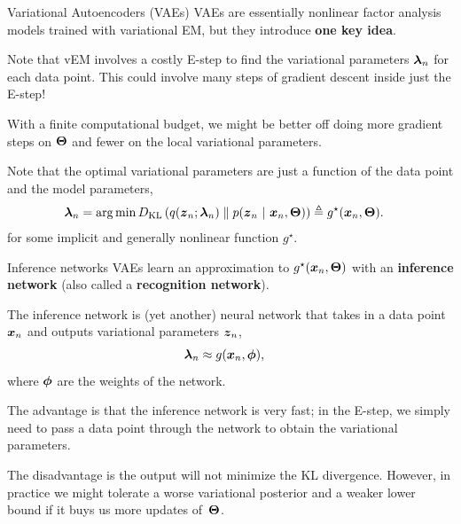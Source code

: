 \documentclass[aspectratio=169]{beamer}
\begin{document}
\begin{frame}{Variational Autoencoders (VAEs)}
VAEs are essentially nonlinear factor analysis models trained with variational EM, but they introduce \textbf{one key idea}.

Note that vEM involves a costly E-step to find the variational parameters $\boldsymbol{\lambda}_n$ for each data point. This could involve many steps of gradient descent inside just the E-step!

With a finite computational budget, we might be better off doing more gradient steps on $\boldsymbol{\Theta}$ and fewer on the local variational parameters.

Note that the optimal variational parameters are just a function of the data point and the model parameters,
\begin{align}
    \boldsymbol{\lambda}_n &= \operatorname*{arg\,min} D_{\textrm{KL}}\left(q(\boldsymbol{z}_n; \boldsymbol{\lambda}_n)\;\|\;p(\boldsymbol{z}_n ~\vert~ \boldsymbol{x}_n, \boldsymbol{\Theta})\right) 
    \triangleq g^\star(\boldsymbol{x}_n, \boldsymbol{\Theta}).
\end{align}
for some implicit and generally nonlinear function $g^\star$.
\end{frame}

\begin{frame}{Inference networks}
VAEs learn an approximation to $g^\star(\boldsymbol{x}_n, \boldsymbol{\Theta})$ with an \textbf{inference network} (also called a \textbf{recognition network}).

The inference network is (yet another) neural network that takes in a data point $\boldsymbol{x}_n$ and outputs variational parameters $\boldsymbol{z}_n$,
\begin{align}
    \boldsymbol{\lambda}_n & \approx g(\boldsymbol{x}_n, \boldsymbol{\phi}),
\end{align}
where $\boldsymbol{\phi}$ are the weights of the network.
    
The advantage is that the inference network is very fast; in the E-step, we simply need to pass a data point through the network to obtain the variational parameters.

The disadvantage is the output will not minimize the KL divergence. However, in practice we might tolerate a worse variational posterior and a weaker lower bound if it buys us more updates of~$\boldsymbol{\Theta}$.

\end{frame}
\end{document}
